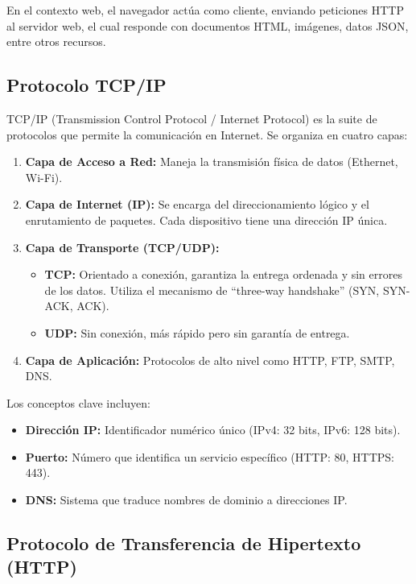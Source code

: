 \documentclass[12pt,letterpaper]{article}
\begin{document}
En el contexto web, el navegador act\'ua como cliente, enviando peticiones HTTP al servidor web, el cual responde con documentos HTML, im\'agenes, datos JSON, entre otros recursos.

\subsection{Protocolo TCP/IP}

TCP/IP (Transmission Control Protocol / Internet Protocol) es la suite de protocolos que permite la comunicaci\'on en Internet. Se organiza en cuatro capas:

\begin{enumerate}
    \item \textbf{Capa de Acceso a Red:} Maneja la transmisi\'on f\'isica de datos (Ethernet, Wi-Fi).
    \item \textbf{Capa de Internet (IP):} Se encarga del direccionamiento l\'ogico y el enrutamiento de paquetes. Cada dispositivo tiene una direcci\'on IP \'unica.
    \item \textbf{Capa de Transporte (TCP/UDP):} 
    \begin{itemize}
        \item \textbf{TCP:} Orientado a conexi\'on, garantiza la entrega ordenada y sin errores de los datos. Utiliza el mecanismo de ``three-way handshake'' (SYN, SYN-ACK, ACK).
        \item \textbf{UDP:} Sin conexi\'on, m\'as r\'apido pero sin garant\'ia de entrega.
    \end{itemize}
    \item \textbf{Capa de Aplicaci\'on:} Protocolos de alto nivel como HTTP, FTP, SMTP, DNS.
\end{enumerate}

Los conceptos clave incluyen:
\begin{itemize}
    \item \textbf{Direcci\'on IP:} Identificador num\'erico \'unico (IPv4: 32 bits, IPv6: 128 bits).
    \item \textbf{Puerto:} N\'umero que identifica un servicio espec\'ifico (HTTP: 80, HTTPS: 443).
    \item \textbf{DNS:} Sistema que traduce nombres de dominio a direcciones IP.
\end{itemize}

\subsection{Protocolo de Transferencia de Hipertexto (HTTP)}
\end{document}
